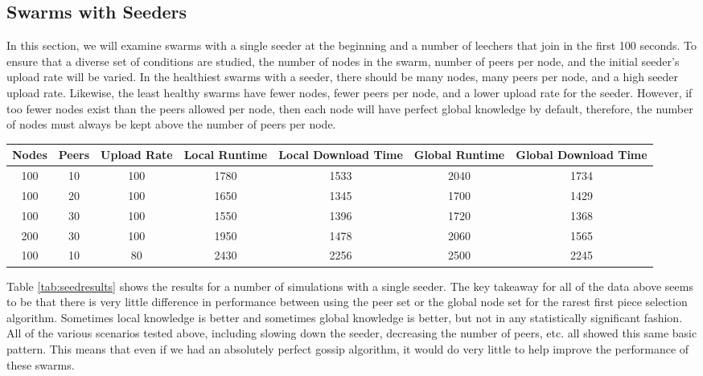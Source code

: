 \subsection{Swarms with Seeders}

In this section, we will examine swarms with a single seeder at the beginning
and a number of leechers that join in the first 100 seconds. To ensure
that a diverse set of conditions are studied, the number of nodes in the swarm, 
number of peers per node, and the initial seeder's upload rate will be varied.
In the healthiest swarms with a seeder, there should be many nodes, many peers per node, and
a high seeder upload rate. Likewise, the least healthy swarms have fewer nodes,
fewer peers per node, and a lower upload rate for the seeder. However, if too fewer
nodes exist than the peers allowed per node, then each node will have perfect global
knowledge by default, therefore, the number of nodes must always be kept above
the number of peers per node. 


\begin{table*}
\centering
\caption{Swarms with Seeds Results}
\begin{tabular}{|c|c|c|c|c|c|c|} \hline
Nodes & Peers & Upload Rate & Local Runtime & Local Download Time & Global Runtime & Global Download Time\\ \hline

100 & 10 & 100 & 1780 & 1533 & 2040 & 1734\\
100 & 20 & 100 & 1650 & 1345 & 1700 & 1429\\
100 & 30 & 100 & 1550 & 1396 & 1720 & 1368\\
200 & 30 & 100 & 1950 & 1478 & 2060 & 1565\\
100 & 10 & 80  & 2430 & 2256 & 2500 & 2245\\
\hline\end{tabular}
\label{tab:seedresults}
\end{table*}


Table \ref{tab:seedresults} shows the results for a number of simulations with a single
seeder. The key takeaway for all of the data above seems to be that there
is very little difference in performance between using the peer set or the
global node set for the rarest first piece selection algorithm. Sometimes
local knowledge is better and sometimes global knowledge is better,
but not in any statistically significant fashion. All of the various
scenarios tested above, including slowing down the seeder, decreasing
the number of peers, etc. all showed this same basic pattern. This means
that even if we had an absolutely perfect gossip algorithm, it would do
very little to help improve the performance of these swarms.

